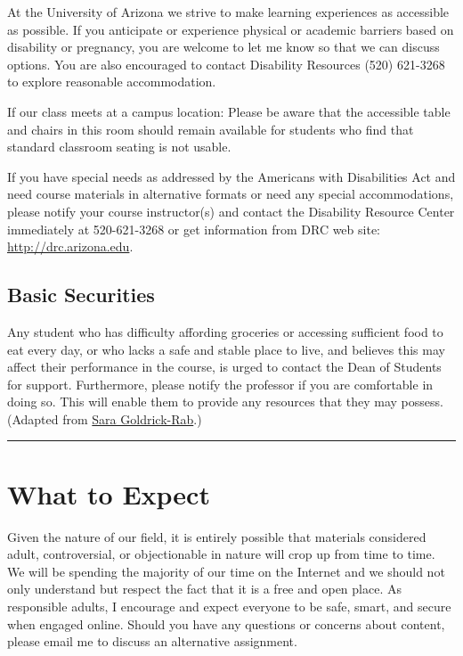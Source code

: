 \documentclass[]{article}
\begin{document}
At the University of Arizona we strive to make learning experiences as
accessible as possible. If you anticipate or experience physical or
academic barriers based on disability or pregnancy, you are welcome to
let me know so that we can discuss options. You are also encouraged to
contact Disability Resources (520) 621-3268 to explore reasonable
accommodation.

If our class meets at a campus location: Please be aware that the
accessible table and chairs in this room should remain available for
students who find that standard classroom seating is not usable.

If you have special needs as addressed by the Americans with
Disabilities Act and need course materials in alternative formats or
need any special accommodations, please notify your course instructor(s)
and contact the Disability Resource Center immediately at 520-621-3268
or get information from DRC web site: \url{http://drc.arizona.edu}.

\hypertarget{basic-securities}{%
\subsection{Basic Securities}\label{basic-securities}}

Any student who has difficulty affording groceries or accessing
sufficient food to eat every day, or who lacks a safe and stable place
to live, and believes this may affect their performance in the course,
is urged to contact the Dean of Students for support. Furthermore,
please notify the professor if you are comfortable in doing so. This
will enable them to provide any resources that they may possess.
(Adapted from
\href{https://medium.com/@saragoldrickrab/basic-needs-security-and-the-syllabus-d24cc7afe8c9}{Sara
Goldrick-Rab}.)

\begin{center}\rule{0.5\linewidth}{\linethickness}\end{center}

\hypertarget{what-to-expect}{%
\section{What to Expect}\label{what-to-expect}}

Given the nature of our field, it is entirely possible that materials
considered adult, controversial, or objectionable in nature will crop up
from time to time. We will be spending the majority of our time on the
Internet and we should not only understand but respect the fact that it
is a free and open place. As responsible adults, I encourage and expect
everyone to be safe, smart, and secure when engaged online. Should you
have any questions or concerns about content, please email me to discuss
an alternative assignment.
\end{document}
